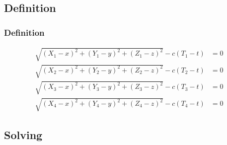 \documentclass[aspectratio=169, xcolor=table]{beamer}
\begin{document}
\subsection{Definition}

\begin{frame}
  \frametitle{Definition}

  \begin{align*}
    \sqrt{(X_1 - x)^2 + (Y_1 - y)^2 + (Z_1 - z)^2} - c (T_1 - t) &= 0 \\
    \sqrt{(X_2 - x)^2 + (Y_2 - y)^2 + (Z_2 - z)^2} - c (T_2 - t) &= 0 \\
    \sqrt{(X_3 - x)^2 + (Y_3 - y)^2 + (Z_3 - z)^2} - c (T_3 - t) &= 0 \\
    \sqrt{(X_4 - x)^2 + (Y_4 - y)^2 + (Z_4 - z)^2} - c (T_4 - t) &= 0
  \end{align*}
\end{frame}

\subsection{Solving}
\end{document}
